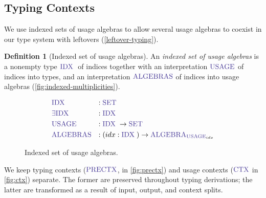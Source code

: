 \documentclass[a4paper,UKenglish,cleveref,autoref,thm-restate,authorcolumns]{lipics-v2019}
\theoremstyle{definition}
\newtheorem{nidefinition}{Definition}
\newcommand{\type}[1]{\textcolor{BlueViolet}{\operatorname{#1}}}
\newcommand{\Set}{\type{SET}}
\newcommand{\PreCtx}{\type{PRECTX}}
\newcommand{\Ctx}{\type{CTX}}
\newcommand{\Idx}{\type{IDX}\;}
\newcommand{\Usage}{\type{USAGE}}
\newcommand{\Algebra}{\type{ALGEBRA}}
\begin{document}
\subsection{Typing Contexts}
\label{contexts}

We use indexed sets of usage algebras to allow several usage algebras to coexist in our type system with leftovers (\autoref{leftover-typing}).
\begin{nidefinition}[Indexed set of usage algebras]
  An \emph{indexed set of usage algebras} is a nonempty type $\Idx$ of indices together with an interpretation $\Usage$ of indices into types, and an interpretation $\type{ALGEBRAS}$ of indices into usage algebras (\autoref{fig:indexed-multiplicities}).
  \begin{figure}[h]
    \begin{equation}
      \begin{split}
        &\Idx               &:{} &\Set \\
        &\type{\exists IDX} &:{} &\Idx \\
        &\Usage             &:{} &\Idx \to \Set \\
        &\type{ALGEBRAS}    &:{} &(idx : \Idx) \to \Algebra_{\Usage_{idx}}
      \end{split}
    \end{equation}
    \caption{Indexed set of usage algebras.}
    \label{fig:indexed-multiplicities}
  \end{figure}
\end{nidefinition}

We keep typing contexts ($\PreCtx$, in \autoref{fig:prectx}) and usage contexts ($\Ctx$ in \autoref{fig:ctx}) separate.
The former are preserved throughout typing derivations; the latter are transformed as a result of input, output, and context splits.
\end{document}
